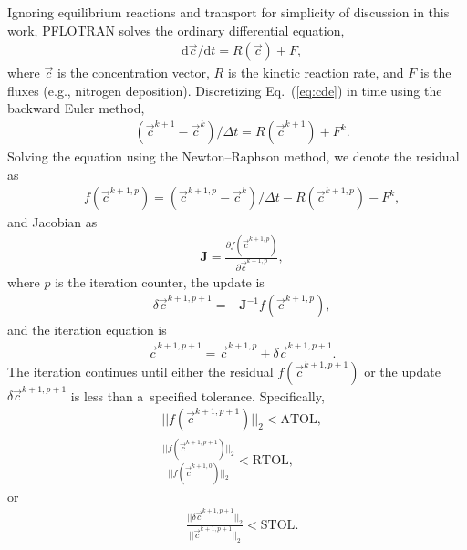 \documentclass[gmd,noline]{copernicus}
\begin{document}
      Ignoring equilibrium reactions and transport for simplicity of
      discussion in this work, PFLOTRAN solves the ordinary differential
      equation,
\begin{align}
 &
\label{eq:cde}
{\mathrm{d} \vec{c}}/{\mathrm{d} t} = {R}(\vec{c}) + {F},
\end{align}%
      where $\vec{c}$ is the concentration vector, ${R}$ is the kinetic
      reaction rate, and ${F}$ is the fluxes (e.g., nitrogen
      deposition). Discretizing Eq.~(\ref{eq:cde}) in time using the
      backward Euler method,
\begin{align}
 &
{(\vec{c}^{k+1} - \vec{c}^k)}/{\Delta t} = {R}(\vec{c}^{k+1}) + {F}^k.
\label{eq:cdedis}
\end{align}%
      Solving the equation using the Newton--Raphson method, we denote the
      residual as
\begin{align}
 &
{f}(\vec{c}^{k+1,p})=(\vec{c}^{k+1,p}-\vec{c}^k)/\Delta t-{R}(\vec{c}^{k+1,p})-{F}^k,
\label{eq:residual}
\end{align}%
      and Jacobian as
\begin{align}
 &
\mathbf{J} = \frac{\partial {f}(\vec{c}^{k+1,p})}{\partial \vec{c}^{k+1,p}},
\label{eq:jacobian}
\end{align}%
      where $p$ is the iteration counter, the update is
\begin{align}
 &
\delta \vec{c}^{k+1,p+1}= -\mathbf{J}^{-1} {f} (\vec{c}^{k+1,p}),
\label{eq:axb}
\end{align}%
      and the iteration equation is
\begin{align}
 &
\vec{c}^{k+1,p+1}=\vec{c}^{k+1,p}+\delta \vec{c}^{k+1,p+1}.
\label{eq:update}
\end{align}%
      The iteration continues until either the residual
      ${f}(\vec{c}^{k+1,p+1})$ or the update $\delta \vec{c}^{k+1,p+1}$ is
      less than a~specified tolerance. Specifically,
\begin{align}
 &
\vert\vert {f}(\vec{c}^{k+1,p+1}) \vert\vert _2 < \text{ATOL},
\label{eq:atol}
\\
&
\frac{\vert\vert {f}(\vec{c}^{k+1,p+1})\vert\vert _2}{\vert\vert {f}(\vec{c}^{k+1,0})\vert\vert _2} < \text{RTOL},
\label{eq:rtol}
\end{align}%
      or
\begin{align}
 &
\frac{\vert\vert \delta \vec{c}^{k+1,p+1} \vert\vert _2}{\vert\vert \vec{c}^{k+1,p+1} \vert\vert _2} < \text{STOL}.
\label{eq:stol}
\end{align}%
\end{document}
